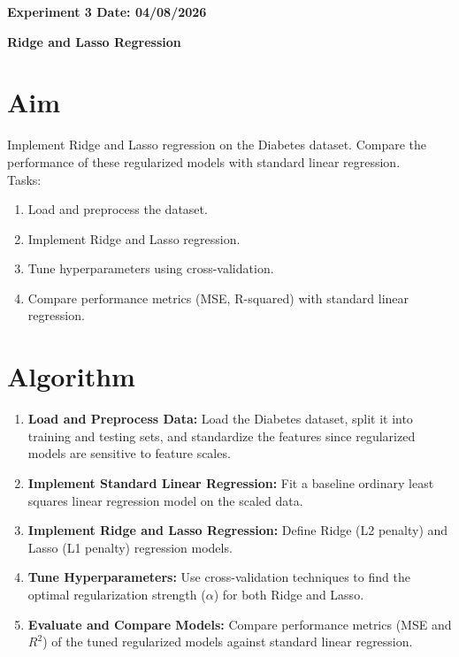 \documentclass[12pt, a4paper]{report}
\begin{document}
\newpage 
\begin{center}
	\bfseries 
	Experiment 3 \hfill Date: 04/08/2026 
\end{center}

\label{exp:3}
\begin{center}
	{\bfseries \Huge Ridge and Lasso Regression}	
\end{center}

\section*{Aim} 
Implement Ridge and Lasso regression on the Diabetes dataset. Compare the performance of these regularized
models with standard linear regression. \\
Tasks:
\begin{enumerate}[\quad -]
	\itemsep 0em 
	
	\item Load and preprocess the dataset.
	\item Implement Ridge and Lasso regression.
	\item Tune hyperparameters using cross-validation.
	\item Compare performance metrics (MSE, R-squared) with standard linear regression.
\end{enumerate}

\section*{Algorithm} 
\begin{enumerate}
	\itemsep 0em
	\item \textbf{Load and Preprocess Data:} Load the Diabetes dataset, split it into training and testing sets, and standardize the features since regularized models are sensitive to feature scales.
	\item \textbf{Implement Standard Linear Regression:} Fit a baseline ordinary least squares linear regression model on the scaled data.
	\item \textbf{Implement Ridge and Lasso Regression:} Define Ridge (L2 penalty) and Lasso (L1 penalty) regression models.
	\item \textbf{Tune Hyperparameters:} Use cross-validation techniques to find the optimal regularization strength ($\alpha$) for both Ridge and Lasso.
	\item \textbf{Evaluate and Compare Models:} Compare performance metrics (MSE and $R^2$) of the tuned regularized models against standard linear regression.
\end{enumerate}
\end{document}
